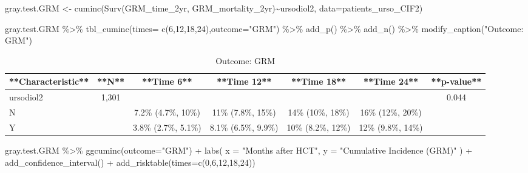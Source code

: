\documentclass[
]{book}
\newenvironment{Shaded}{\begin{snugshade}}{\end{snugshade}}
\newcommand{\AttributeTok}[1]{\textcolor[rgb]{0.77,0.63,0.00}{#1}}
\newcommand{\DecValTok}[1]{\textcolor[rgb]{0.00,0.00,0.81}{#1}}
\newcommand{\FunctionTok}[1]{\textcolor[rgb]{0.00,0.00,0.00}{#1}}
\newcommand{\NormalTok}[1]{#1}
\newcommand{\OtherTok}[1]{\textcolor[rgb]{0.56,0.35,0.01}{#1}}
\newcommand{\SpecialCharTok}[1]{\textcolor[rgb]{0.00,0.00,0.00}{#1}}
\newcommand{\StringTok}[1]{\textcolor[rgb]{0.31,0.60,0.02}{#1}}
\begin{document}
\begin{Shaded}
\begin{Highlighting}[]
\NormalTok{gray.test.GRM }\OtherTok{\textless{}{-}} \FunctionTok{cuminc}\NormalTok{(}\FunctionTok{Surv}\NormalTok{(GRM\_time\_2yr, GRM\_mortality\_2yr)}\SpecialCharTok{\textasciitilde{}}\NormalTok{ursodiol2, }\AttributeTok{data=}\NormalTok{patients\_urso\_CIF2)}

\NormalTok{gray.test.GRM }\SpecialCharTok{\%\textgreater{}\%} \FunctionTok{tbl\_cuminc}\NormalTok{(}\AttributeTok{times=} \FunctionTok{c}\NormalTok{(}\DecValTok{6}\NormalTok{,}\DecValTok{12}\NormalTok{,}\DecValTok{18}\NormalTok{,}\DecValTok{24}\NormalTok{),}\AttributeTok{outcome=}\StringTok{"GRM"}\NormalTok{) }\SpecialCharTok{\%\textgreater{}\%} 
  \FunctionTok{add\_p}\NormalTok{() }\SpecialCharTok{\%\textgreater{}\%} 
  \FunctionTok{add\_n}\NormalTok{() }\SpecialCharTok{\%\textgreater{}\%} 
  \FunctionTok{modify\_caption}\NormalTok{(}\StringTok{"Outcome: GRM"}\NormalTok{)}
\end{Highlighting}
\end{Shaded}

\begin{table}

\caption{\label{tab:unnamed-chunk-43}Outcome: GRM}
\centering
\begin{tabular}[t]{l|c|c|c|c|c|c}
\hline
**Characteristic** & **N** & **Time 6** & **Time 12** & **Time 18** & **Time 24** & **p-value**\\
\hline
ursodiol2 & 1,301 &  &  &  &  & 0.044\\
\hline
N &  & 7.2\% (4.7\%, 10\%) & 11\% (7.8\%, 15\%) & 14\% (10\%, 18\%) & 16\% (12\%, 20\%) & \\
\hline
Y &  & 3.8\% (2.7\%, 5.1\%) & 8.1\% (6.5\%, 9.9\%) & 10\% (8.2\%, 12\%) & 12\% (9.8\%, 14\%) & \\
\hline
\end{tabular}
\end{table}

\begin{Shaded}
\begin{Highlighting}[]
\NormalTok{gray.test.GRM }\SpecialCharTok{\%\textgreater{}\%} \FunctionTok{ggcuminc}\NormalTok{(}\AttributeTok{outcome=}\StringTok{"GRM"}\NormalTok{) }\SpecialCharTok{+} 
  \FunctionTok{labs}\NormalTok{(}
    \AttributeTok{x =} \StringTok{"Months after HCT"}\NormalTok{,}
    \AttributeTok{y =} \StringTok{"Cumulative Incidence (GRM)"}
\NormalTok{  ) }\SpecialCharTok{+} 
  \FunctionTok{add\_confidence\_interval}\NormalTok{() }\SpecialCharTok{+}
  \FunctionTok{add\_risktable}\NormalTok{(}\AttributeTok{times=}\FunctionTok{c}\NormalTok{(}\DecValTok{0}\NormalTok{,}\DecValTok{6}\NormalTok{,}\DecValTok{12}\NormalTok{,}\DecValTok{18}\NormalTok{,}\DecValTok{24}\NormalTok{))}
\end{Highlighting}
\end{Shaded}
\end{document}
